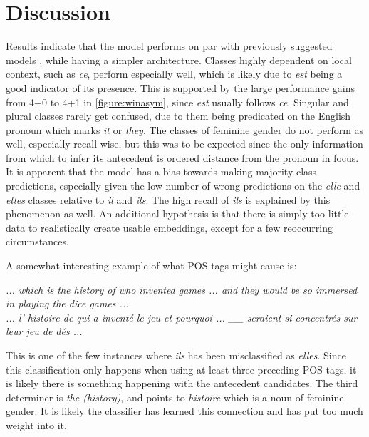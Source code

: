 \documentclass[11pt]{article}
\begin{document}
\section{Discussion}

Results indicate that the model performs on par with previously suggested models \cite{Hardmeier2013Latent}, while having a simpler architecture.
Classes highly dependent on local context, such as \emph{ce}, perform especially well, which is likely due to \emph{est} being a good indicator of its presence.
This is supported by the large performance gains from 4+0 to 4+1 in \cref{figure:winasym}, since \emph{est} usually follows \emph{ce}.
Singular and plural classes rarely get confused, due to them being predicated on the English pronoun which marks \emph{it} or \emph{they}.
The classes of feminine gender do not perform as well, especially recall-wise, but this was to be expected since the only information from which to infer its antecedent is ordered distance from the pronoun in focus.
It is apparent that the model has a bias towards making majority class predictions, especially given the low number of wrong predictions on the \emph{elle} and \emph{elles} classes relative to \emph{il} and \emph{ils}.
The high recall of \emph{ils} is explained by this phenomenon as well.
An additional hypothesis is that there is simply too little data to realistically create usable embeddings, except for a few reoccurring circumstances.

A somewhat interesting example of what POS tags might cause is:

\emph{... which is the history of who invented games ... and they would be so immersed in playing the dice games ...} \\
\emph{... l' histoire de qui a inventé le jeu et pourquoi ... \_\_ seraient si concentrés sur leur jeu de dés ...}

This is one of the few instances where \emph{ils} has been misclassified as \emph{elles}. Since this classification only happens when using at least three preceding POS tags, it is likely there is something happening with the antecedent candidates. The third determiner is \emph{the (history)}, and points to \emph{histoire} which is a noun of feminine gender. It is likely the classifier has learned this connection and has put too much weight into it.
\end{document}
